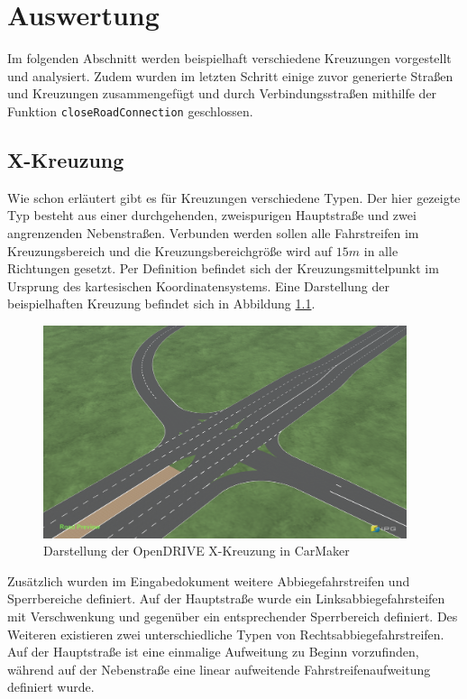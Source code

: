 \chapter{Auswertung}

Im folgenden Abschnitt werden beispielhaft verschiedene Kreuzungen vorgestellt und analysiert. Zudem wurden im letzten Schritt einige zuvor generierte Straßen und Kreuzungen zusammengefügt und durch Verbindungsstraßen mithilfe der Funktion \texttt{closeRoadConnection} geschlossen.

\section{X-Kreuzung}
Wie schon erläutert gibt es für Kreuzungen verschiedene Typen. Der hier gezeigte Typ besteht aus einer durchgehenden, zweispurigen Hauptstraße und zwei angrenzenden Nebenstraßen. Verbunden werden sollen alle Fahrstreifen im Kreuzungsbereich und die Kreuzungsbereichgröße wird auf \(15 m\) in alle Richtungen gesetzt. Per Definition befindet sich der Kreuzungsmittelpunkt im Ursprung des kartesischen Koordinatensystems. Eine Darstellung der beispielhaften Kreuzung befindet sich in Abbildung \ref{abb6}.

\begin{figure}[H]
\flushleft
\includegraphics[width=0.95\textwidth]{fig/junction4.png}
\caption{Darstellung der OpenDRIVE X-Kreuzung in CarMaker}
\label{abb6}
\end{figure}

Zusätzlich wurden im Eingabedokument weitere Abbiegefahrstreifen und Sperrbereiche definiert. Auf der Hauptstraße wurde ein Linksabbiegefahrsteifen mit Verschwenkung und gegenüber ein entsprechender Sperrbereich definiert. Des Weiteren existieren zwei unterschiedliche Typen von Rechtsabbiegefahrstreifen. Auf der Hauptstraße ist eine einmalige Aufweitung zu Beginn vorzufinden, während auf der Nebenstraße eine linear aufweitende Fahrstreifenaufweitung definiert wurde.

